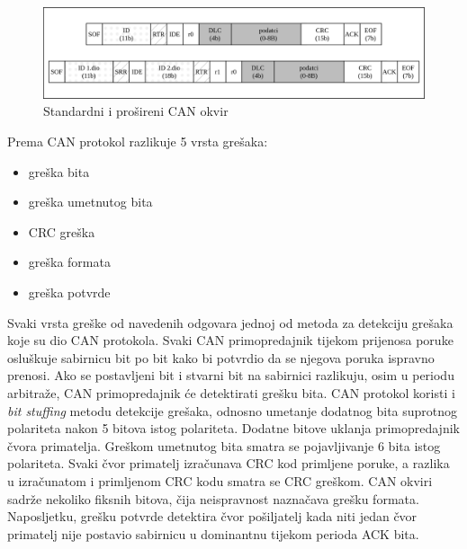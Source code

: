 \documentclass[times, utf8, diplomski, numeric]{fer}
\begin{document}
\begin{figure}[htb]
\centering
\includegraphics[width=\textwidth]{slike/CAN_okvir.png}
\caption{Standardni i prošireni CAN okvir}
\label{fig:CAN_okvir}
\end{figure}
\newpage
Prema \cite{bosch1991} CAN protokol razlikuje 5 vrsta grešaka:
\begin{itemize}
    \item greška bita 
    \item greška umetnutog bita 
    \item CRC greška 
    \item greška formata 
    \item greška potvrde 
\end{itemize}

Svaki vrsta greške od navedenih odgovara jednoj od metoda za detekciju grešaka koje su dio CAN protokola. Svaki CAN primopredajnik tijekom prijenosa poruke osluškuje sabirnicu bit po bit kako bi potvrdio da se njegova poruka ispravno prenosi. Ako se postavljeni bit i stvarni bit na sabirnici razlikuju, osim u periodu arbitraže, CAN primopredajnik će detektirati grešku bita. CAN protokol koristi i \textit{bit stuffing} metodu detekcije grešaka, odnosno umetanje dodatnog bita suprotnog polariteta nakon 5 bitova istog polariteta. Dodatne bitove uklanja primopredajnik čvora primatelja. Greškom umetnutog bita smatra se pojavljivanje 6 bita istog polariteta. Svaki čvor primatelj izračunava CRC kod primljene poruke, a razlika u izračunatom i primljenom CRC kodu smatra se CRC greškom. CAN okviri sadrže nekoliko fiksnih bitova, čija neispravnost naznačava grešku formata. Naposljetku, grešku potvrde detektira čvor pošiljatelj kada niti jedan čvor primatelj nije postavio sabirnicu u dominantnu \grqq tijekom perioda ACK bita.
\end{document}

